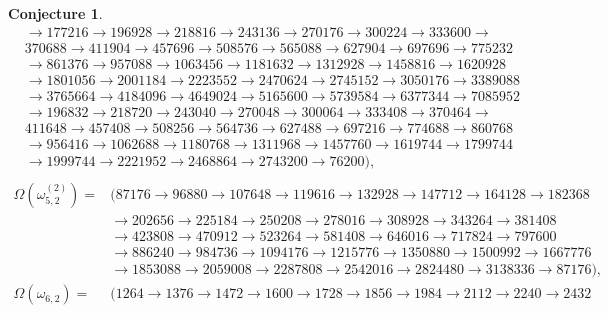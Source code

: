 \documentclass[11pt,a4paper]{article}
\newtheorem{conjecture}{Conjecture}[section]
\begin{document}
\begin{conjecture}
$$\begin{array}{ll}
	&\rightarrow177216\rightarrow196928\rightarrow218816\rightarrow243136\rightarrow270176\rightarrow300224\rightarrow333600\rightarrow\\&370688\rightarrow411904\rightarrow457696\rightarrow508576\rightarrow565088\rightarrow627904\rightarrow697696\rightarrow775232\\&\rightarrow861376\rightarrow957088\rightarrow1063456\rightarrow1181632\rightarrow1312928\rightarrow1458816\rightarrow1620928\\&\rightarrow1801056\rightarrow2001184\rightarrow2223552\rightarrow2470624\rightarrow2745152\rightarrow3050176\rightarrow3389088\\&\rightarrow3765664\rightarrow4184096\rightarrow4649024\rightarrow5165600\rightarrow5739584\rightarrow6377344\rightarrow7085952\\&\rightarrow196832\rightarrow218720\rightarrow243040\rightarrow270048\rightarrow300064\rightarrow333408\rightarrow370464\rightarrow\\&411648\rightarrow457408\rightarrow508256\rightarrow564736\rightarrow627488\rightarrow697216\rightarrow774688\rightarrow860768\\&\rightarrow956416\rightarrow1062688\rightarrow1180768\rightarrow1311968\rightarrow1457760\rightarrow1619744\rightarrow1799744\\&\rightarrow1999744\rightarrow2221952\rightarrow2468864\rightarrow2743200\rightarrow76200\bigr),\\
\end{array}$$	
$$\begin{array}{ll}
	\Omega(\omega^{(2)}_{5,2})=&
	\bigl(87176\rightarrow96880\rightarrow107648\rightarrow119616\rightarrow132928\rightarrow147712\rightarrow164128\rightarrow182368\\& \rightarrow202656\rightarrow225184\rightarrow250208\rightarrow278016\rightarrow308928\rightarrow343264\rightarrow381408\\&\rightarrow423808\rightarrow470912\rightarrow523264\rightarrow581408\rightarrow646016\rightarrow717824\rightarrow797600\\&\rightarrow886240\rightarrow984736\rightarrow1094176\rightarrow1215776\rightarrow1350880\rightarrow1500992\rightarrow1667776\\&\rightarrow1853088\rightarrow2059008\rightarrow2287808\rightarrow2542016\rightarrow2824480\rightarrow3138336\rightarrow87176\bigr),\\
	\Omega(\omega_{6,2})=&\bigl(1264\rightarrow1376\rightarrow1472\rightarrow1600\rightarrow1728\rightarrow1856\rightarrow1984\rightarrow2112\rightarrow2240\rightarrow2432\\

\end{array}$$
\end{conjecture}
\end{document}
